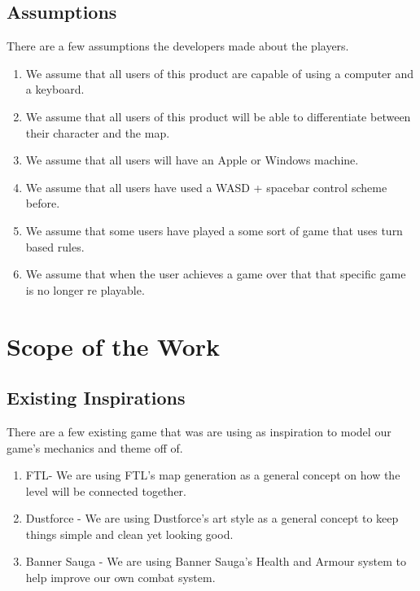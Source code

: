 \documentclass{article}
\begin{document}
\subsection{Assumptions}
\quad There are a few assumptions the developers made about the players.
\begin{enumerate}[{A}1. ]
	\item We assume that all users of this product are capable of using a computer and a keyboard. 
	\item We assume that all users of this product will be able to differentiate between their character and the map.
	\item We assume that all users will have an Apple or Windows machine.
	\item We assume that all users have used a WASD + spacebar control scheme before.
	\item We assume that some users have played a some sort of game that uses turn based rules.
	\item We assume that when the user achieves a game over that that specific game is no longer re playable.
\end{enumerate}
\section{Scope of the Work}
\subsection{Existing Inspirations}
\quad There are a few existing game that was are using as inspiration to model our game's mechanics and theme off of.
\begin{enumerate}[{EI}1. ]
	\item FTL- We are using FTL's map generation as a general concept on how the level will be connected together.
	\item Dustforce - We are using Dustforce's art style as a general concept to keep things simple and clean yet looking good.
	\item Banner Sauga - We are using Banner Sauga's Health and Armour system to help improve our own combat system.  
\end{enumerate}
\end{document}
